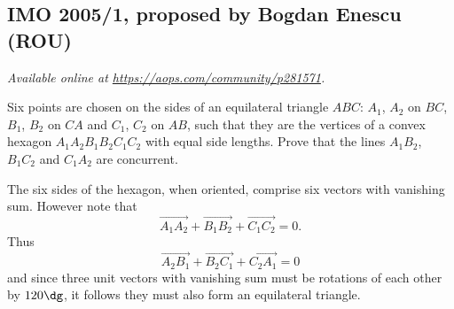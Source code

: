 \documentclass[11pt]{scrartcl}
\begin{document}
\subsection{IMO 2005/1, proposed by Bogdan Enescu (ROU)}
\textsl{Available online at \url{https://aops.com/community/p281571}.}
\begin{mdframed}[style=mdpurplebox,frametitle={Problem statement}]
Six points are chosen on the sides of an equilateral triangle $ABC$:
$A_1$, $A_2$ on $BC$, $B_1$, $B_2$ on $CA$ and $C_1$, $C_2$ on $AB$,
such that they are the vertices of a
convex hexagon $A_1A_2B_1B_2C_1C_2$ with equal side lengths.
Prove that the lines $A_1B_2$, $B_1C_2$ and $C_1A_2$ are concurrent.
\end{mdframed}
The six sides of the hexagon, when oriented, comprise
six vectors with vanishing sum.
However note that \[ \overrightarrow{A_1A_2}
+ \overrightarrow{B_1B_2}
+ \overrightarrow{C_1C_2} = 0. \]
Thus
\[ \overrightarrow{A_2B_1} + \overrightarrow{B_2C_1} +
\overrightarrow{C_2A_1} = 0 \]
and since three unit vectors with vanishing sum
must be rotations of each other by $120\dg$,
it follows they must also form an equilateral triangle.
\end{document}
